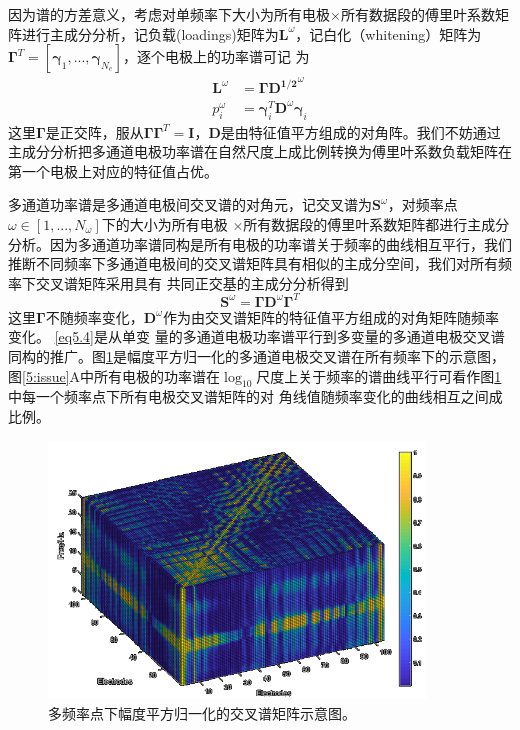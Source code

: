 因为谱的方差意义，考虑对单频率下大小为所有电极$\times$所有数据段的傅里叶系数矩阵进行主成分分析，记负载(loadings)矩阵为$\mathbf{L}^\omega$，记白化（whitening）矩阵为$\mathbf{\Gamma}^T=[\mathbf{\gamma}_1,...,\mathbf{\gamma}_{N_e}]$，逐个电极上的功率谱可记
为
\begin{equation}\label{eq5.3}
\begin{aligned}
\mathbf{L}^\omega& =\mathbf{\Gamma}\mathbf{D^{1/2}}^\omega\\
p_i^\omega& =\mathbf{\gamma}_i^T\mathbf{D}^\omega\mathbf{\gamma}_i
\end{aligned}
\end{equation}
这里$\mathbf{\Gamma}$是正交阵，服从$\mathbf{\Gamma}\mathbf{\Gamma}^T=\mathbf{I}$，$\mathbf{D}$是由特征值平方组成的对角阵。我们不妨通过主成分分析把多通道电极功率谱在自然尺度上成比例转换为傅里叶系数负载矩阵在第一个电极上对应的特征值占优。

多通道功率谱是多通道电极间交叉谱的对角元，记交叉谱为$\mathbf{S}^\omega$，对频率点$\omega\in[1,...,N_\omega]$下的大小为所有电极
$\times$所有数据段的傅里叶系数矩阵都进行主成分分析。因为多通道功率谱同构是所有电极的功率谱关于频率的曲线相互平行，我们推断不同频率下多通道电极间的交叉谱矩阵具有相似的主成分空间，我们对所有频率下交叉谱矩阵采用具有
共同正交基的主成分分析得到
\begin{equation}\label{eq5.4}
\mathbf{S}^\omega=\mathbf{\Gamma}\mathbf{D}^\omega\mathbf{\Gamma}^T
\end{equation}
这里$\mathbf{\Gamma}$不随频率变化，$\mathbf{D}^\omega$作为由交叉谱矩阵的特征值平方组成的对角矩阵随频率变化。 \eqref{eq5.4}是从单变
量的多通道电极功率谱平行到多变量的多通道电极交叉谱同构的推广。图\ref{5:tensor}是幅度平方归一化的多通道电极交叉谱在所有频率下的示意图，
图\ref{5:issue}A中所有电极的功率谱在$\log_{10}$尺度上关于频率的谱曲线平行可看作图\ref{5:tensor}中每一个频率点下所有电极交叉谱矩阵的对
角线值随频率变化的曲线相互之间成比例。
\begin{figure}[!h]
\includegraphics[width=10cm]{pic/palos/spectratensor.png}
\caption{多频率点下幅度平方归一化的交叉谱矩阵示意图。}
\label{5:tensor}
\end{figure}

